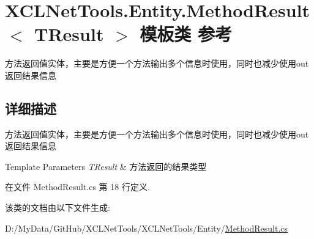 \hypertarget{class_x_c_l_net_tools_1_1_entity_1_1_method_result}{}\section{X\+C\+L\+Net\+Tools.\+Entity.\+Method\+Result$<$ T\+Result $>$ 模板类 参考}
\label{class_x_c_l_net_tools_1_1_entity_1_1_method_result}


方法返回值实体，主要是方便一个方法输出多个信息时使用，同时也减少使用out返回结果信息  




\subsection{详细描述}
方法返回值实体，主要是方便一个方法输出多个信息时使用，同时也减少使用out返回结果信息 


\begin{DoxyTemplParams}{Template Parameters}
{\em T\+Result} & 方法返回的结果类型\\
\hline
\end{DoxyTemplParams}


在文件 Method\+Result.\+cs 第 18 行定义.



该类的文档由以下文件生成\+:\begin{DoxyCompactItemize}
\item 
D\+:/\+My\+Data/\+Git\+Hub/\+X\+C\+L\+Net\+Tools/\+X\+C\+L\+Net\+Tools/\+Entity/\hyperlink{_method_result_8cs}{Method\+Result.\+cs}\end{DoxyCompactItemize}
